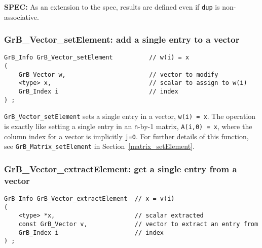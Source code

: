 \documentclass[12pt]{article}
\begin{document}
\begin{spec}
{\bf SPEC:} As an extension to the spec, results are defined even if \verb'dup' is non-associative.
\end{spec}

\subsubsection{{\sf GrB\_Vector\_setElement:}    add a single entry to a vector}
\label{vector_setElement}

\begin{mdframed}[userdefinedwidth=6in]
{\footnotesize
\begin{verbatim}
GrB_Info GrB_Vector_setElement          // w(i) = x
(
    GrB_Vector w,                       // vector to modify
    <type> x,                           // scalar to assign to w(i)
    GrB_Index i                         // index
) ;
\end{verbatim} } \end{mdframed}

\verb'GrB_Vector_setElement' sets a single entry in a vector, \verb'w(i) = x'.
The operation is exactly like setting a single entry in an \verb'n'-by-1
matrix, \verb'A(i,0) = x', where the column index for a vector is implicitly
\verb'j=0'.  For further details of this function, see
\verb'GrB_Matrix_setElement' in Section~\ref{matrix_setElement}.

\subsubsection{{\sf GrB\_Vector\_extractElement:} get a single entry from a vector}
\label{vector_extractElement}

\begin{mdframed}[userdefinedwidth=6in]
{\footnotesize
\begin{verbatim}
GrB_Info GrB_Vector_extractElement  // x = v(i)
(
    <type> *x,                      // scalar extracted
    const GrB_Vector v,             // vector to extract an entry from
    GrB_Index i                     // index
) ;
\end{verbatim} } \end{mdframed}
\end{document}
